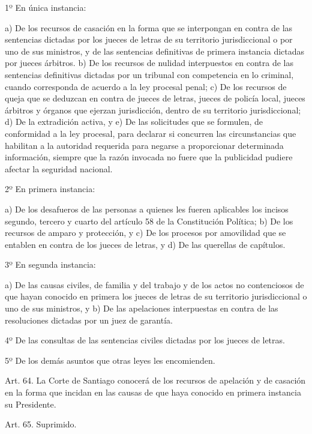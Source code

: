     1º En única instancia:

    a) De los recursos de casación en la forma que se interpongan en contra de las sentencias dictadas por los jueces de letras de su territorio jurisdiccional o por uno de sus ministros, y de las sentencias definitivas de primera instancia dictadas por jueces árbitros.
    b) De los recursos de nulidad interpuestos en contra de las sentencias definitivas dictadas por un tribunal con competencia en lo criminal, cuando corresponda de acuerdo a la ley procesal penal;
    c) De los recursos de queja que se deduzcan en contra de jueces de letras, jueces de policía local, jueces árbitros y órganos que ejerzan jurisdicción, dentro de su territorio jurisdiccional;
    d) De la extradición activa, y
    e) De las solicitudes que se formulen, de conformidad a la ley procesal, para declarar si concurren las circunstancias que habilitan a la autoridad requerida para negarse a proporcionar determinada información, siempre que la razón invocada no fuere que la publicidad pudiere afectar la seguridad nacional.

    2º En primera instancia:

    a) De los desafueros de las personas a quienes les fueren aplicables los incisos segundo, tercero y cuarto del artículo 58 de la Constitución Política;
    b) De los recursos de amparo y protección, y
    c) De los procesos por amovilidad que se entablen en contra de los jueces de letras, y
    d) De las querellas de capítulos.

    3º En segunda instancia:

    a) De las causas civiles, de familia y del trabajo y de los actos no contenciosos de que hayan conocido en primera los jueces de letras de su territorio jurisdiccional o uno de sus ministros, y
    b) De las apelaciones interpuestas en contra de las resoluciones dictadas por un juez de garantía.

    4º De las consultas de las sentencias civiles dictadas por los jueces de letras.

    5º De los demás asuntos que otras leyes les encomienden.



    Art. 64. La Corte de Santiago conocerá de los recursos de apelación y de casación en la forma que incidan en las causas de que haya conocido en primera instancia su Presidente.


    Art. 65. Suprimido.

